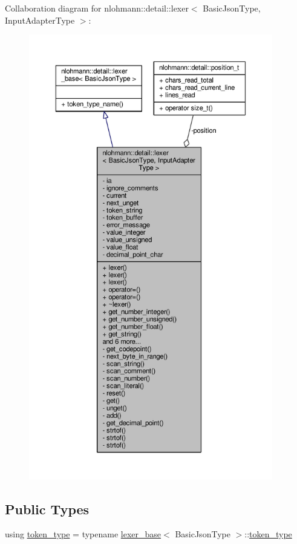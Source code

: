 Collaboration diagram for nlohmann\+:\+:detail\+:\+:lexer$<$ Basic\+Json\+Type, Input\+Adapter\+Type $>$\+:
\nopagebreak
\begin{figure}[H]
\begin{center}
\leavevmode
\includegraphics[height=550pt]{classnlohmann_1_1detail_1_1lexer__coll__graph}
\end{center}
\end{figure}
\subsection*{Public Types}
\begin{DoxyCompactItemize}
\item 
using \hyperlink{classnlohmann_1_1detail_1_1lexer_a986907dff5ceb4fa06aa8ff301822726}{token\+\_\+type} = typename \hyperlink{classnlohmann_1_1detail_1_1lexer__base}{lexer\+\_\+base}$<$ Basic\+Json\+Type $>$\+::\hyperlink{classnlohmann_1_1detail_1_1lexer__base_aa3538cce439a2de6c7893e627b38c454}{token\+\_\+type}
\end{DoxyCompactItemize}
